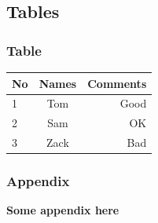 \documentclass[12pt]{beamer}
\begin{document}
\subsection{Tables}

\begin{frame}
  \frametitle{Table}
  \begin{tabular}{|l|c|r|}
    \textbf{No} & \textbf{Names} & \textbf{Comments}  \\
    \hline
    1 & Tom & Good  \\
    2 & Sam & OK    \\ 
    3 & Zack & Bad \\
  \end{tabular}
\end{frame}








\appendix

\begin{frame}
  \frametitle{Appendix}
  \textbf{Some appendix here}
\end{frame}
\end{document}
